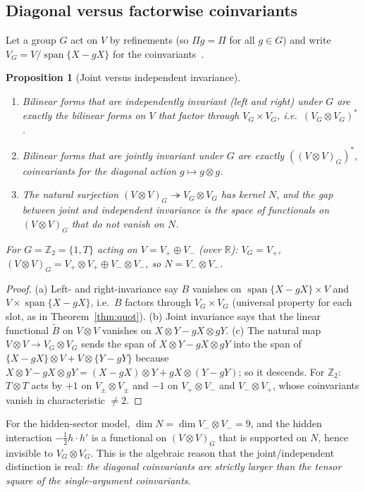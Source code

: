 \documentclass[11pt,a4paper]{article}
\newcommand{\RR}{\mathbb{R}}
\newcommand{\spn}{\operatorname{span}}
\theoremstyle{plain}
\newtheorem{proposition}[theorem]{Proposition}
\theoremstyle{definition}
\begin{document}
\subsection{Diagonal versus factorwise coinvariants}\label{sec:coinv}
Let a group $G$ act on $V$ by refinements (so $\Pi g=\Pi$ for all $g\in G$) and write $V_G=V/\spn\{X-gX\}$ for the coinvariants~\cite{Bro82}.
\begin{proposition}[Joint versus independent invariance]\label{prop:coinv}
\begin{enumerate}[label=(\alph*)]
\item Bilinear forms that are \emph{independently} invariant (left and right) under $G$ are exactly the bilinear forms on $V$ that factor through $V_G\times V_G$, i.e.\ $(V_G\otimes V_G)^*$.
\item Bilinear forms that are \emph{jointly} invariant under $G$ are exactly $((V\otimes V)_G)^*$, coinvariants for the diagonal action $g\mapsto g\otimes g$.
\item The natural surjection $(V\otimes V)_G\twoheadrightarrow V_G\otimes V_G$ has kernel $N$, and the gap between joint and independent invariance is the space of functionals on $(V\otimes V)_G$ that do not vanish on $N$.
\end{enumerate}
For $G=\mathbb Z_2=\{1,T\}$ acting on $V=V_+\oplus V_-$ (over $\RR$): $V_G=V_+$, $(V\otimes V)_G=V_+\otimes V_+\oplus V_-\otimes V_-$, so $N=V_-\otimes V_-$.
\end{proposition}
\begin{proof}
(a) Left- and right-invariance say $B$ vanishes on $\spn\{X-gX\}\times V$ and $V\times\spn\{X-gX\}$, i.e.\ $B$ factors through $V_G\times V_G$ (universal property for each slot, as in Theorem~\ref{thm:quot}).
(b) Joint invariance says that the linear functional $\tilde B$ on $V\otimes V$ vanishes on $X\otimes Y-gX\otimes gY$.
(c) The natural map $V\otimes V\to V_G\otimes V_G$ sends the span of $X\otimes Y-gX\otimes gY$ into the span of $\{X-gX\}\otimes V+V\otimes\{Y-gY\}$ because $X\otimes Y-gX\otimes gY=(X-gX)\otimes Y+gX\otimes(Y-gY)$; so it descends. For $\mathbb Z_2$: $T\otimes T$ acts by $+1$ on $V_\pm\otimes V_\pm$ and $-1$ on $V_+\otimes V_-$ and $V_-\otimes V_+$, whose coinvariants vanish in characteristic $\ne2$.
\end{proof}
For the hidden-sector model, $\dim N=\dim V_-\otimes V_-=9$, and the hidden interaction $-\tfrac12h\!\cdot h'$ is a functional on $(V\otimes V)_G$ that is supported on $N$, hence invisible to $V_G\otimes V_G$. This is the algebraic reason that the joint/independent distinction is real: \emph{the diagonal coinvariants are strictly larger than the tensor square of the single-argument coinvariants}.
\end{document}
